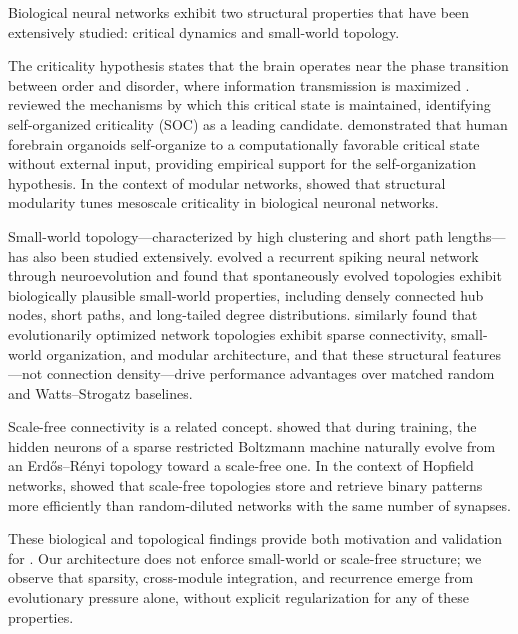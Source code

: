 Biological neural networks exhibit two structural properties that have been
extensively studied: critical dynamics and small-world topology.

The criticality hypothesis states that the brain operates near the phase
transition between order and disorder, where information transmission is
maximized \citep{beggs2007criticality}. \citet{poil2025network} reviewed the
mechanisms by which this critical state is maintained, identifying
self-organized criticality (SOC) as a leading candidate.
\citet{2026organoid} demonstrated that human forebrain organoids self-organize
to a computationally favorable critical state without external input,
providing empirical support for the self-organization hypothesis. In the
context of modular networks, \citet{2025hierarchicalmodular} showed that
structural modularity tunes mesoscale criticality in biological neuronal
networks.

Small-world topology—characterized by high clustering and short path
lengths—has also been studied extensively. \citet{2024emergence} evolved a
recurrent spiking neural network through neuroevolution and found that
spontaneously evolved topologies exhibit biologically plausible small-world
properties, including densely connected hub nodes, short paths, and long-tailed
degree distributions. \citet{2026evolutionarily} similarly found that
evolutionarily optimized network topologies exhibit sparse connectivity,
small-world organization, and modular architecture, and that these structural
features—not connection density—drive performance advantages over matched
random and Watts–Strogatz baselines.

Scale-free connectivity is a related concept. \citet{mocanu2018scalable}
showed that during training, the hidden neurons of a sparse restricted
Boltzmann machine naturally evolve from an Erd\H{o}s–R\'enyi topology toward a
scale-free one. In the context of Hopfield networks, \citet{2004topology}
showed that scale-free topologies store and retrieve binary patterns more
efficiently than random-diluted networks with the same number of synapses.

These biological and topological findings provide both motivation and
validation for \modnet{}. Our architecture does not enforce small-world or
scale-free structure; we observe that sparsity, cross-module integration, and
recurrence emerge from evolutionary pressure alone, without explicit
regularization for any of these properties.


